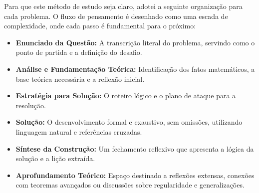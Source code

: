 \documentclass[10pt,a4paper]{article}
\begin{document}
	Para que este método de estudo seja claro, adotei a seguinte organização para cada problema. O fluxo de pensamento é desenhado como uma escada de complexidade, onde cada passo é fundamental para o próximo:
	
	\begin{itemize}
		\item \textbf{Enunciado da Questão:} A transcrição literal do problema, servindo como o ponto de partida e a definição do desafio.
		\item \textbf{Análise e Fundamentação Teórica:} Identificação dos fatos matemáticos, a base teórica necessária e a reflexão inicial.
		\item \textbf{Estratégia para Solução:} O roteiro lógico e o plano de ataque para a resolução.
		\item \textbf{Solução:} O desenvolvimento formal e exaustivo, sem omissões, utilizando linguagem natural e referências cruzadas.
		\item \textbf{Síntese da Construção:} Um fechamento reflexivo que apresenta a lógica da solução e a lição extraída.
		\item \textbf{Aprofundamento Teórico:} Espaço destinado a reflexões extensas, conexões com teoremas avançados ou discussões sobre regularidade e generalizações.
	\end{itemize}
	\begin{center}
	\end{center}
\end{document}
